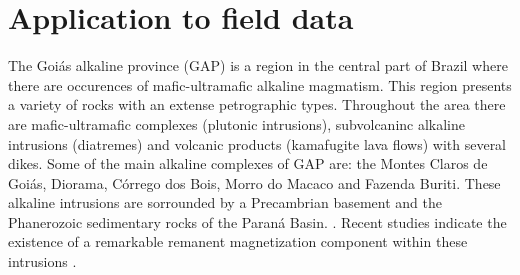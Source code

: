 \section{Application to field data}
\label{sec:real_application}

The Goi{\'a}s alkaline province (GAP) is a region in the central part of Brazil where there are occurences of mafic-ultramafic alkaline magmatism. This region presents a variety of rocks with an extense petrographic types. Throughout the area there are mafic-ultramafic complexes (plutonic intrusions), subvolcaninc alkaline intrusions (diatremes) and volcanic products (kamafugite lava flows) with several dikes. Some of the main alkaline complexes of GAP are: the Montes Claros de Goi\'as, Diorama, C\'orrego dos Bois, Morro do Macaco and Fazenda Buriti. These alkaline intrusions are sorrounded by a Precambrian basement and the Phanerozoic sedimentary rocks of the Paran\'a Basin. \citep{junqueira_brod_2005,carlson_etal_2007,marangoni_mantovani_2013,dutra_etal_2014}. Recent studies indicate the existence of a remarkable remanent magnetization component within these intrusions \citep{marangoni_mantovani_2013,oliveirajr_etal_2015,marangoni_etal_2016,zhang_etal_2018}. 

